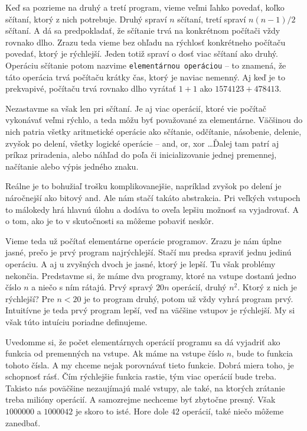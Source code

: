 Keď sa pozrieme na druhý a tretí program, vieme veľmi ľahko povedať, koľko sčítaní, ktorý z nich
potrebuje. Druhý spraví $n$ sčítaní, tretí spraví $n(n-1)/2$ sčítaní. A dá sa predpokladať, že
sčítanie trvá na konkrétnom počítači vždy rovnako dlho. Zrazu teda vieme bez ohľadu na rýchlosť
konkrétneho počítaču povedať, ktorý je rýchlejší. Jeden totiž spraví o dosť viac sčítaní ako druhý.
Operáciu sčítanie potom nazvime \texttt{elementárnou operáciou} -- to znamená, že táto operácia trvá
počítaču krátky čas, ktorý je naviac nemenný. Aj keď je to prekvapivé, počítaču trvá rovnako dlho
vyrátať $1+1$ ako $1574123+478413$.

Nezastavme sa však len pri sčítaní. Je aj viac operácií, ktoré vie počítač vykonávať veľmi rýchlo, a
teda môžu byť považované za elementárne. Väčšinou do nich patria všetky aritmetické operácie ako
sčítanie, odčítanie, násobenie, delenie, zvyšok po delení, všetky logické operácie -- and, or, xor
\dots Ďalej tam patrí aj príkaz priradenia, alebo náhľad do poľa či inicializovanie jednej
premennej, načítanie alebo výpis jedného znaku.

Reálne je to bohužiaľ trošku komplikovanejšie, napríklad zvyšok po delení je náročnejší ako bitový
and. Ale nám stačí takáto abstrakcia. Pri veľkých vstupoch to málokedy hrá hlavnú úlohu a dodáva to
oveľa lepšiu možnosť sa vyjadrovať. A o tom, ako je to v skutočnosti sa môžeme pobaviť neskôr.

Vieme teda už počítať elementárne operácie programov. Zrazu je nám úplne jasné, prečo je prvý
program najrýchlejší. Stačí mu predsa spraviť jednu jedinú operáciu. A aj u zvyšných dvoch je jasné,
ktorý je lepší. Tu však problémy nekončia. Predstavme si, že máme dva programy, ktoré na vstupe
dostanú jedno číslo $n$ a niečo s ním rátajú. Prvý spravý $20n$ operácií, druhý $n^2$. Ktorý z nich
je rýchlejší? Pre $n<20$ je to program druhý, potom už vždy vyhrá program prvý. Intuitívne je teda
prvý program lepší, veď na väčšine vstupov je rýchlejší. My si však túto intuíciu poriadne
definujeme.


Uvedomme si, že počet elementárnych operácií programu sa dá vyjadriť ako
funkcia od premenných na vstupe. Ak máme na vstupe číslo $n$, bude to funkcia tohoto čísla. A my
chceme nejak porovnávať tieto funkcie. Dobrá miera toho, je schopnosť rásť. Čím rýchlejšie funkcia
rastie, tým viac operácií bude treba. Takisto nás poväčšine nezaujímajú malé vstupy, ale také, na
ktorých zrátanie treba milióny operácií. A samozrejme nechceme byť zbytočne presný. Však $1000000$ a
$1000042$ je skoro to isté. Hore dole $42$ operácií, také niečo môžeme zanedbať.

